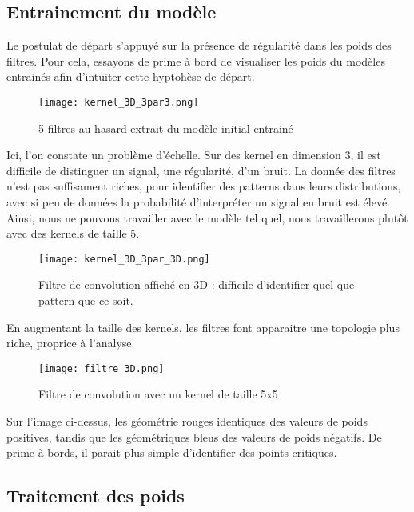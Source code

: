 \documentclass[12pt,a4paper]{article}
\begin{document}
\subsection{Entrainement du modèle} 
Le postulat de départ s'appuyé sur la présence de régularité dans les poids des filtres. Pour cela, essayons de prime à bord de visualiser les poids du modèles entrainés afin d'intuiter cette hyptohèse de départ. 
\begin{figure}[H] %
    \centering    %
    \texttt{[image: kernel\_3D\_3par3.png]} %
    \caption{5 filtres au hasard extrait du modèle initial entrainé} %
    \label{fig:mon_image} %
\end{figure}
Ici, l'on constate un problème d'échelle. Sur des kernel en dimension 3, il est difficile de distinguer un signal, une régularité, d'un bruit. La donnée des filtres n'est pas suffisament riches, pour identifier des patterns dans leurs distributions, avec si peu de données la probabilité d'interpréter un signal en bruit est élevé. Ainsi, nous ne pouvons travailler avec le modèle tel quel, nous travaillerons plutôt avec des kernels de taille 5. 
\begin{figure}[H] %
    \centering    %
    \texttt{[image: kernel\_3D\_3par\_3D.png]} %
    \caption{Filtre de convolution affiché en 3D : difficile d'identifier quel que pattern que ce soit. } %
    \label{fig:mon_image} %
\end{figure}
En augmentant la taille des kernels, les filtres font apparaitre une topologie plus riche, proprice à l'analyse. 
\begin{figure}[H] %
    \centering    %
    \texttt{[image: filtre\_3D.png]} %
    \caption{Filtre de convolution avec un kernel de taille 5x5 } %
    \label{fig:mon_image} %
\end{figure}
Sur l'image ci-dessus, les géométrie rouges identiques des valeurs de poids positives, tandis que les géométriques bleus des valeurs de poids négatifs. De prime à bords, il parait plus simple d'identifier des points critiques. 
\subsection{Traitement des poids}
\end{document}
